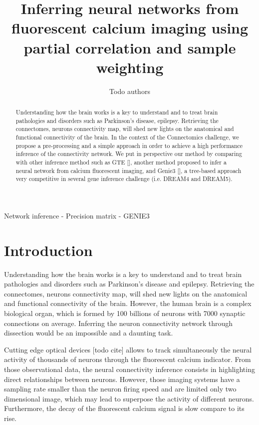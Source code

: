\documentclass[wcp]{jmlr}
\title[Connectomics challenge]{Inferring neural networks from fluorescent
                               calcium imaging using partial correlation and
                               sample weighting}
\author{Todo authors}
\begin{document}
\maketitle


\begin{abstract}
Understanding how the brain works is a key to understand and to treat
brain pathologies and disorders such as Parkinson's disease, epilepsy.
Retrieving the connectomes, neurons connectivity map, will shed new lights on
the anatomical and functional connectivity of the brain.
In the context of the Connectomics challenge, we propose a pre-processing and a simple approach in order to achieve a high performance inference of the connectivity network.
We put in perspective our method by comparing with other inference method such as GTE [], another method proposed to infer a neural network from calcium fluorescent imaging, and Genie3 [], a tree-based approach very competitive in several gene inference challenge (i.e. DREAM4 and DREAM5).\\


\end{abstract}

\begin{keywords}
Network inference - Precision matrix - GENIE3
\end{keywords}


\section{Introduction}\label{sec:intro}

Understanding how the brain works is a key to understand and to treat
brain pathologies and disorders such as Parkinson's disease and epilepsy.
Retrieving the connectomes, neurons connectivity map, will shed new lights on
the anatomical and functional connectivity of the brain. However,
the human brain is a complex biological organ, which is formed by 100
billions of neurons with 7000 synaptic connections on average. Inferring the
neuron connectivity network through dissection would be an impossible
and a daunting task.

Cutting edge optical devices [todo cite] allows to track simultaneously
the neural activity of thousands of neurons through the fluorescent
calcium indicator.
From those observational data, the neural connectivity inference consists in
highlighting direct relationships between neurons. However, those imaging
systems have a sampling rate smaller than the neuron firing speed and are
limited only two dimensional image, which may lead to superpose the activity
of different neurons. Furthermore, the decay of the fluorescent calcium signal
is slow compare to its rise.
\end{document}
